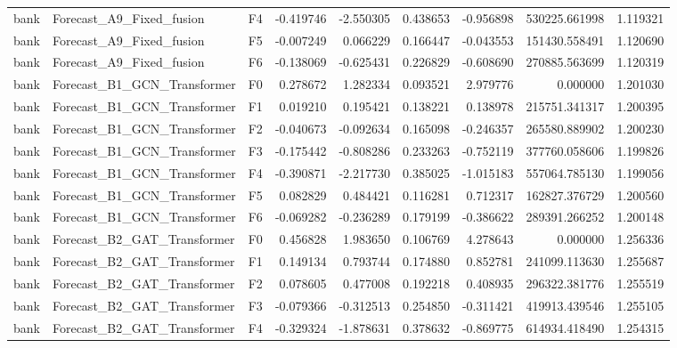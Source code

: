 \begin{tabular}{lllrrrrrr}
      bank &     Forecast\_A9\_Fixed\_fusion &  F4 & -0.419746 & -2.550305 & 0.438653 & -0.956898 &    530225.661998 &             1.119321 \\
      bank &     Forecast\_A9\_Fixed\_fusion &  F5 & -0.007249 &  0.066229 & 0.166447 & -0.043553 &    151430.558491 &             1.120690 \\
      bank &     Forecast\_A9\_Fixed\_fusion &  F6 & -0.138069 & -0.625431 & 0.226829 & -0.608690 &    270885.563699 &             1.120319 \\
      bank &  Forecast\_B1\_GCN\_Transformer &  F0 &  0.278672 &  1.282334 & 0.093521 &  2.979776 &         0.000000 &             1.201030 \\
      bank &  Forecast\_B1\_GCN\_Transformer &  F1 &  0.019210 &  0.195421 & 0.138221 &  0.138978 &    215751.341317 &             1.200395 \\
      bank &  Forecast\_B1\_GCN\_Transformer &  F2 & -0.040673 & -0.092634 & 0.165098 & -0.246357 &    265580.889902 &             1.200230 \\
      bank &  Forecast\_B1\_GCN\_Transformer &  F3 & -0.175442 & -0.808286 & 0.233263 & -0.752119 &    377760.058606 &             1.199826 \\
      bank &  Forecast\_B1\_GCN\_Transformer &  F4 & -0.390871 & -2.217730 & 0.385025 & -1.015183 &    557064.785130 &             1.199056 \\
      bank &  Forecast\_B1\_GCN\_Transformer &  F5 &  0.082829 &  0.484421 & 0.116281 &  0.712317 &    162827.376729 &             1.200560 \\
      bank &  Forecast\_B1\_GCN\_Transformer &  F6 & -0.069282 & -0.236289 & 0.179199 & -0.386622 &    289391.266252 &             1.200148 \\
      bank &  Forecast\_B2\_GAT\_Transformer &  F0 &  0.456828 &  1.983650 & 0.106769 &  4.278643 &         0.000000 &             1.256336 \\
      bank &  Forecast\_B2\_GAT\_Transformer &  F1 &  0.149134 &  0.793744 & 0.174880 &  0.852781 &    241099.113630 &             1.255687 \\
      bank &  Forecast\_B2\_GAT\_Transformer &  F2 &  0.078605 &  0.477008 & 0.192218 &  0.408935 &    296322.381776 &             1.255519 \\
      bank &  Forecast\_B2\_GAT\_Transformer &  F3 & -0.079366 & -0.312513 & 0.254850 & -0.311421 &    419913.439546 &             1.255105 \\
      bank &  Forecast\_B2\_GAT\_Transformer &  F4 & -0.329324 & -1.878631 & 0.378632 & -0.869775 &    614934.418490 &             1.254315 \\

\end{tabular}

